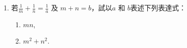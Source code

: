 \documentclass[11pt]{article}
\begin{document}
\begin{enumerate}
        \hrulefill

            \hrulefill
            
            \hrulefill
            
            \hrulefill
            
            \hrulefill
            
            \hrulefill
            
            \hrulefill
            
            \hrulefill
            
            \hrulefill
            
            \hrulefill
            
            \hrulefill
            
            \hrulefill

            \hrulefill

            \hrulefill
            
            \hrulefill
            
            \hrulefill
            
            \hrulefill
            
            \hrulefill
            
            \hrulefill
            
            \hrulefill
            
            \hrulefill
            
            \hrulefill
            
            \hrulefill
            
            \hrulefill

        \pagebreak
        \item 若$\displaystyle \frac{1}{m}+\frac{1}{n}=\frac{1}{a}$ 及 $m+n=b$，試以$a$ 和 $b$表述下列表達式：\begin{enumerate}
            \item $mn$,
            \item $m^2+n^2$.
        \end{enumerate}

        \hrulefill

            \hrulefill
            
            \hrulefill
            
            \hrulefill
            
            \hrulefill
            

\end{enumerate}
\end{document}
